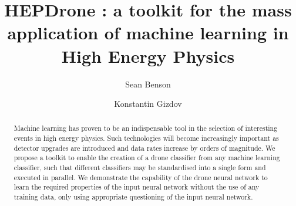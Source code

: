 \documentclass[final,5p,times,twocolumn]{elsarticle}
\begin{document}

\begin{frontmatter}
\author[nl]{Sean Benson}
\author[uoe]{Konstantin Gizdov}
\address[nl]{Nikhef National Institute for Subatomic Physics, Amsterdam, The Netherlands}
\address[uoe]{School of Physics and Astronomy, University of Edinburgh, Edinburgh, United Kingdom}
\title{HEPDrone : a toolkit for the mass application of machine learning in High Energy Physics}
\begin{abstract}
  \noindent
  Machine learning has proven to be an indispensable tool in the selection of
  interesting events in high energy physics. Such technologies will become increasingly
  important as detector upgrades are introduced and data rates increase by orders of magnitude.
  We propose a toolkit to enable the creation of a drone classifier from any machine learning
  classifier, such that different classifiers may be standardised into a single form and executed
  in parallel. We demonstrate the capability of the drone neural network 
  to learn the required properties of the input neural network without
  the use of any training data, only using appropriate questioning of the input neural network.
\end{abstract}
\end{frontmatter}










\end{document}
